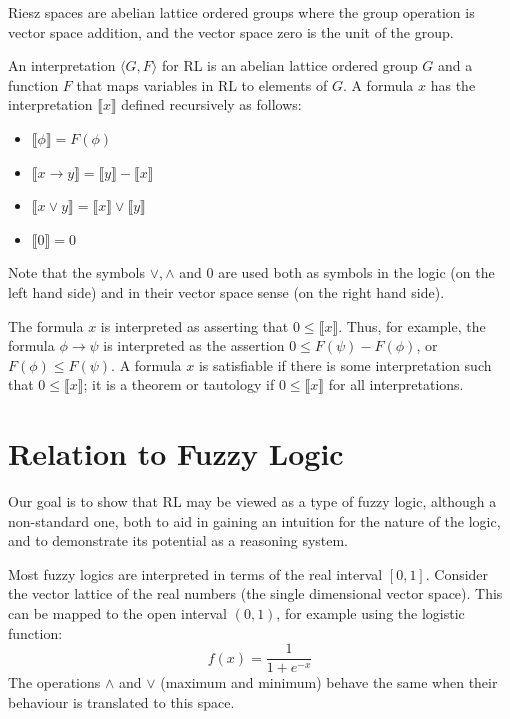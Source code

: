 \documentclass[journal]{IEEEtran}
\theoremstyle{definition}
\newcommand{\interp}[1]{\llbracket #1 \rrbracket}
\begin{document}
Riesz spaces are abelian lattice ordered groups where the group
operation is vector space addition, and the vector space zero is the
unit of the group.

An interpretation $\langle G, F\rangle$ for RL is an abelian lattice
ordered group $G$ and a function $F$ that maps variables in RL to
elements of $G$. A formula $x$ has the interpretation $\interp{x}$
defined recursively as follows:
\begin{itemize}
\item $\interp{\phi} = F(\phi)$
\item $\interp{x \rightarrow y} = \interp{y} - \interp{x}$
\item $\interp{x \lor y} = \interp{x} \lor \interp{y}$
\item $\interp{0} = 0$
\end{itemize}
Note that the symbols $\lor, \land$ and $0$ are used both as symbols
in the logic (on the left hand side) and in their vector space sense
(on the right hand side).

The formula $x$ is interpreted as asserting that $0 \le
\interp{x}$. Thus, for example, the formula $\phi \rightarrow \psi$ is
interpreted as the assertion $0 \le F(\psi) - F(\phi)$, or $F(\phi)
\le F(\psi)$. A formula $x$ is satisfiable if there is some
interpretation such that $0 \le \interp{x}$; it is a theorem or
tautology if $0 \le \interp{x}$ for all interpretations.

\section{Relation to Fuzzy Logic}

Our goal is to show that RL may be viewed as a type of fuzzy logic,
although a non-standard one, both to aid in gaining an intuition for
the nature of the logic, and to demonstrate its potential as a
reasoning system.

Most fuzzy logics are interpreted in terms of the real interval
$[0,1]$. Consider the vector lattice of the real numbers (the
single dimensional vector space). This can be mapped to the open
interval $(0,1)$, for example using the logistic function:
$$f(x) = \frac{1}{1 + e^{-x}}$$
The operations $\land$ and $\lor$ (maximum and minimum) behave the
same when their behaviour is translated to this space.
\end{document}
